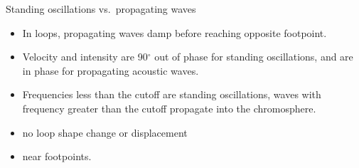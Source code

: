 \documentclass[table]{beamer}
\begin{document}
\begin{frame}{Standing oscillations vs.\ propagating waves}
    \begin{itemize}
        \item In loops, propagating waves damp before
            reaching opposite footpoint.
        \item Velocity and intensity are 90$^{\circ}$ out of phase
            for standing oscillations, and are in phase for propagating
            acoustic waves.
        \item Frequencies less than the cutoff are standing oscillations,
            waves with frequency greater than the cutoff propagate into
            the chromosphere.
        \item no loop shape change or displacement
        \item near footpoints.
    \end{itemize}
\end{frame}%
\end{document}
